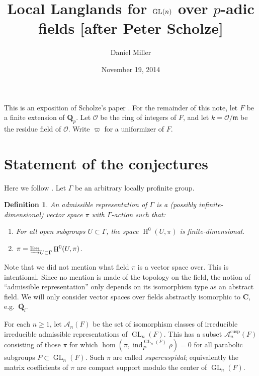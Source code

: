 \documentclass{article}
\title{Local Langlands for \texorpdfstring{$\GL(n)$}{GL(n)} over \texorpdfstring{$p$}{p}-adic fields [after Peter Scholze]}
\author{Daniel Miller}
\date{November 19, 2014}
\DeclareMathOperator{\GL}{GL}
\DeclareMathOperator{\h}{H}
\DeclareMathOperator{\induce}{ind}
\newcommand{\cA}{\mathcal{A}}
\newcommand{\cO}{\mathcal{O}}
\newcommand{\dC}{\mathbf{C}}
\newcommand{\dQ}{\mathbf{Q}}
\newcommand{\fm}{\mathfrak{m}}
\newtheorem{definition}[subsection]{Definition}
\begin{document}
\maketitle





This is an exposition of Scholze's paper \cite{scholze-2013}. For the 
remainder of this note, let $F$ be a finite extension of $\dQ_p$. Let 
$\cO$ be the ring of integers of $F$, and let $k=\cO/\fm$ be the residue field 
of $\cO$. Write $\varpi$ for a uniformizer of $F$. 





\section{Statement of the conjectures}

Here we follow \cite{wedhorn-2008}. Let $\Gamma$ be an arbitrary locally 
profinite group. 

\begin{definition}
An \emph{admissible representation of $\Gamma$} is a (possibly 
infinite-dimensional) vector space $\pi$ with $\Gamma$-action such that: 
\begin{enumerate}
  \item For all open subgroups $U\subset \Gamma$, the space 
    $\h^0(U,\pi)$ is finite-dimensional. 
  \item $\pi=\varinjlim_{U\subset \Gamma} \h^0(U,\pi)$. 
\end{enumerate}
\end{definition}

Note that we did not mention what field $\pi$ is a vector space over. This 
is intentional. Since no mention is made of the topology on the field, the 
notion of ``admissible representation'' only depends on its isomorphism type 
as an abstract field. We will only consider vector spaces over fields 
abstractly isomorphic to $\dC$, e.g.~$\overline{\dQ_l}$. 

For each $n\geqslant 1$, let $\cA_n(F)$ be the set of isomorphism classes of 
irreducible irreducible admissible representations of $\GL_n(F)$. This has 
a subset $\cA_n^\mathrm{cusp}(F)$ consisting of those $\pi$ for which 
$\hom(\pi,\induce_P^{\GL_n(F)} \rho)=0$ for all parabolic subgroups 
$P\subset \GL_n(F)$. Such $\pi$ are called \emph{supercuspidal}; equivalently 
the matrix coefficients of $\pi$ are compact support modulo the center of 
$\GL_n(F)$. 
\end{document}
